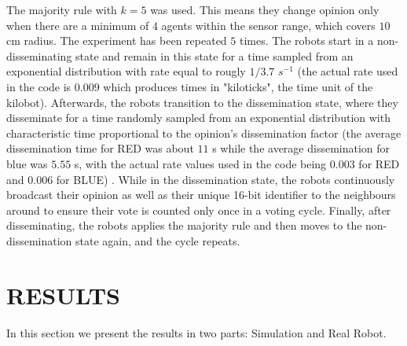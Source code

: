 \documentclass[sigconf]{acmart}
\begin{document}
The majority rule with $k=5$ was used. This means they change opinion only when there are a minimum of $4$ agents within the sensor range, which covers $10$ cm radius. The experiment has been repeated $5$ times.
The robots start in a non-disseminating state and remain in this state for a time sampled from an exponential distribution with rate equal to rougly $1/3.7$ $s^{-1}$ (the actual rate used in the code is $0.009$ which produces times in "kiloticks", the time unit of the kilobot).  Afterwards, the robots transition to the dissemination state, where they disseminate for a time  randomly sampled from an exponential distribution with characteristic time proportional to the opinion’s dissemination factor (the average dissemination time for RED was about $11$ s while the average dissemination for blue was $5.55$ s, with the actual rate values used in the code being $0.003$ for RED and $0.006$ for BLUE) . While in the dissemination state, the robots continuously broadcast their opinion as well as their unique 16-bit identiﬁer to the neighbours around to ensure their vote is counted only once in a voting cycle. Finally, after disseminating, the robots applies the majority rule and then moves to the non-dissemination state again, and the cycle repeats. 





   

\section{RESULTS}
\label{sec:results}
In this section we present the results in two parts: Simulation and Real Robot.
\end{document}
